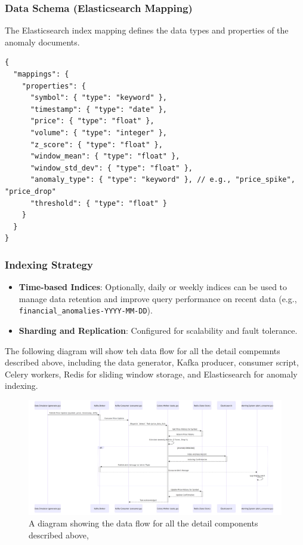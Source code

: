 \subsubsection{Data Schema (Elasticsearch Mapping)}

The Elasticsearch index mapping defines the data types and properties of the anomaly documents.
\begin{verbatim}
{
  "mappings": {
    "properties": {
      "symbol": { "type": "keyword" },
      "timestamp": { "type": "date" },
      "price": { "type": "float" },
      "volume": { "type": "integer" },
      "z_score": { "type": "float" },
      "window_mean": { "type": "float" },
      "window_std_dev": { "type": "float" },
      "anomaly_type": { "type": "keyword" }, // e.g., "price_spike", "price_drop"
      "threshold": { "type": "float" }
    }
  }
}
\end{verbatim}

\subsubsection{Indexing Strategy}
\begin{itemize}
    \item \textbf{Time-based Indices}: Optionally, daily or weekly indices can be used to manage data retention and improve query performance on recent data (e.g., \texttt{financial\_anomalies-YYYY-MM-DD}).
    \item \textbf{Sharding and Replication}: Configured for scalability and fault tolerance.
\end{itemize}


The following diagram will show teh data flow for all the detail compemnts described above, including the data generator, Kafka producer, consumer script, Celery workers, Redis for sliding window storage, and Elasticsearch for anomaly indexing.


\begin{figure}
\centering


\includegraphics[width=\textwidth]{figures/backend-1.png}

\caption{A diagram showing the data flow for all the detail components described above,}

\label{fig:Expdiagram1}
\end{figure}

